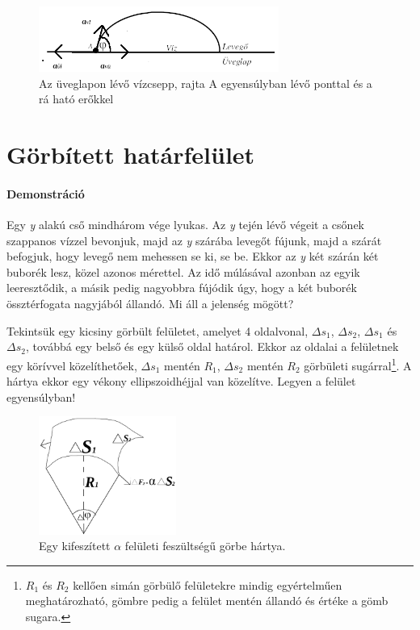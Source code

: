\documentclass[12pt,a4paper]{scrartcl}
\begin{document}
\begin{figure}[htbp]
	\begin{center}
		\includegraphics[width=0.7\textwidth]{tetel72.png}
		\caption{Az üveglapon lévő vízcsepp, rajta A egyensúlyban lévő ponttal és a rá ható erőkkel \label{fig:illeszkedesi_szog}}
	\end{center}
\end{figure}

\section{Görbített határfelület}

\footnotesize
\paragraph{Demonstráció} Egy \textit{y} alakú cső mindhárom vége lyukas. Az \textit{y} tején lévő végeit a csőnek szappanos vízzel bevonjuk, majd az \textit{y} szárába levegőt fújunk, majd a szárát befogjuk, hogy levegő nem mehessen se ki, se be. Ekkor az \textit{y} két szárán két buborék lesz, közel azonos mérettel. Az idő múlásával azonban az egyik leeresztődik, a másik pedig nagyobbra fújódik úgy, hogy a két buborék össztérfogata nagyjából állandó. Mi áll a jelenség mögött?
\normalsize

Tekintsük egy kicsiny görbült felületet, amelyet 4 oldalvonal, $\Delta {s_1}$, $\Delta {s_2}$, $\Delta {s_1}$ és $\Delta {s_2}$, továbbá egy belső és egy külső oldal határol. Ekkor az oldalai a felületnek egy körívvel közelíthetőek, $\Delta {s_1}$ mentén $R_1$, $\Delta {s_2}$ mentén $R_2$ görbületi sugárral\footnote{$R_1$ és $R_2$ kellően simán görbülő felületekre mindig egyértelműen meghatározható, gömbre pedig a felület mentén állandó és értéke a gömb sugara.}. A hártya ekkor egy vékony ellipszoidhéjjal van közelítve. Legyen a felület egyensúlyban!

\begin{figure}[htbp]
	\begin{center}
		\includegraphics[width=0.4\textwidth]{tetel73.png}
		\caption{Egy kifeszített $\alpha$ felületi feszültségű görbe hártya. }
	\end{center}
\end{figure}
\end{document}
